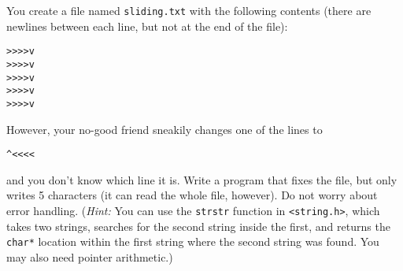 You create a file named \texttt{sliding.txt} with the following contents (there are newlines between each line, but not at the end of the file):

\begin{verbatim}
>>>>v
>>>>v
>>>>v
>>>>v
>>>>v
\end{verbatim}

However, your no-good friend sneakily changes one of the lines to \begin{verbatim}^<<<<\end{verbatim} and you don't know which line it is. Write a program that fixes the file, but only writes 5 characters (it can read the whole file, however). Do not worry about error handling. (\textit{Hint:} You can use the \texttt{strstr} function in \texttt{<string.h>}, which takes two strings, searches for the second string inside the first, and returns the \texttt{char*} location within the first string where the second string was found. You may also need pointer arithmetic.)

\begin{answer}

\end{answer}
